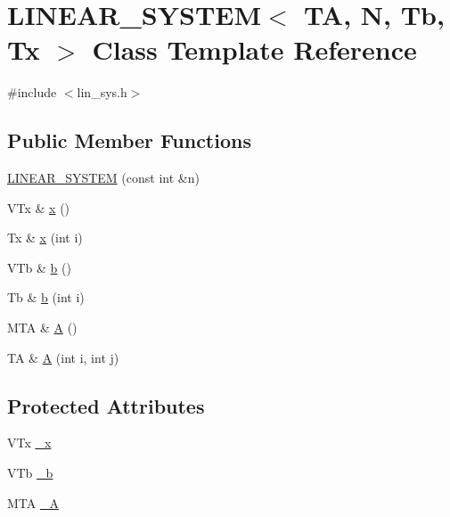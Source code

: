 \hypertarget{class_l_i_n_e_a_r___s_y_s_t_e_m}{}\section{L\+I\+N\+E\+A\+R\+\_\+\+S\+Y\+S\+T\+EM$<$ TA, N, Tb, Tx $>$ Class Template Reference}
\label{class_l_i_n_e_a_r___s_y_s_t_e_m}


{\ttfamily \#include $<$lin\+\_\+sys.\+h$>$}

\subsection*{Public Member Functions}
\begin{DoxyCompactItemize}
\item 
\mbox{\hyperlink{class_l_i_n_e_a_r___s_y_s_t_e_m_a7486740300aa9998e1aa4f9d90790eb2}{L\+I\+N\+E\+A\+R\+\_\+\+S\+Y\+S\+T\+EM}} (const int \&n)
\item 
V\+Tx \& \mbox{\hyperlink{class_l_i_n_e_a_r___s_y_s_t_e_m_a0585adb67fae39d29e887d03d071fc74}{x}} ()
\item 
Tx \& \mbox{\hyperlink{class_l_i_n_e_a_r___s_y_s_t_e_m_ad00a0cae1d479dd527cc374c210b9429}{x}} (int i)
\item 
V\+Tb \& \mbox{\hyperlink{class_l_i_n_e_a_r___s_y_s_t_e_m_a6754b4aaf5db40c45522d289e969f917}{b}} ()
\item 
Tb \& \mbox{\hyperlink{class_l_i_n_e_a_r___s_y_s_t_e_m_ae7c2a505d8cd0c6eb4b49bc0ece4e233}{b}} (int i)
\item 
M\+TA \& \mbox{\hyperlink{class_l_i_n_e_a_r___s_y_s_t_e_m_a307c8896bb3218768f016a2a24de3bcd}{A}} ()
\item 
TA \& \mbox{\hyperlink{class_l_i_n_e_a_r___s_y_s_t_e_m_a5163aedcb567d591f5812bd3c892fb07}{A}} (int i, int j)
\end{DoxyCompactItemize}
\subsection*{Protected Attributes}
\begin{DoxyCompactItemize}
\item 
V\+Tx \mbox{\hyperlink{class_l_i_n_e_a_r___s_y_s_t_e_m_abc1a6ac63a5c66a14e47cdb22559fefa}{\+\_\+x}}
\item 
V\+Tb \mbox{\hyperlink{class_l_i_n_e_a_r___s_y_s_t_e_m_a2a040e59b49e900b61c4db4385623fd0}{\+\_\+b}}
\item 
M\+TA \mbox{\hyperlink{class_l_i_n_e_a_r___s_y_s_t_e_m_afee92f4a1bc570f9ead4742047756525}{\+\_\+A}}
\end{DoxyCompactItemize}


